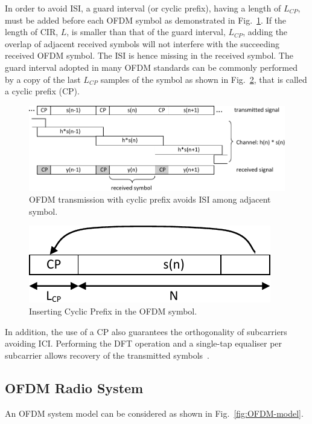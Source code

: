 In order to avoid ISI, a guard interval (or cyclic prefix), having a length of $L_{CP}$, must be added before each OFDM symbol as demonstrated in Fig.~\ref{fig:CIR-CP}.
If the length of CIR, $L$, is smaller than that of the guard interval, $L_{CP}$, adding the overlap of adjacent received symbols will not interfere with the succeeding received OFDM symbol.
The ISI is hence missing in the received symbol.
The guard interval adopted in many OFDM standards can be commonly performed by a copy of the last $L_{CP}$ samples of the symbol as shown in Fig.~\ref{fig:CP}, that is called a cyclic prefix (CP).

\begin{figure}
	\centerline{\includegraphics [width=0.8\columnwidth] {Figures/CIR_CP.pdf} }
	\caption{OFDM transmission with cyclic prefix avoids ISI among adjacent symbol.}
	\label{fig:CIR-CP}
\end{figure}

\begin{figure}
	\centerline{\includegraphics [width=0.4\columnwidth] {Figures/CP.pdf} }
	\caption{Inserting Cyclic Prefix in the OFDM symbol.}
	\label{fig:CP}
\end{figure}

In addition, the use of a CP also guarantees the orthogonality of subcarriers avoiding ICI. Performing the DFT operation and a single-tap equaliser per subcarrier allows recovery of the transmitted symbols~\cite{farhang2008signal}.

\subsection{OFDM Radio System}

An OFDM system model can be considered as shown in Fig.~\ref{fig:OFDM-model}.

